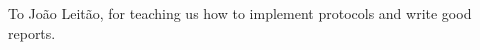 \documentclass[sigconf]{acmart}
\begin{document}
\begin{acks}
    To João Leitão, for teaching us how to implement protocols and write good reports.
\end{acks}



\end{document}
